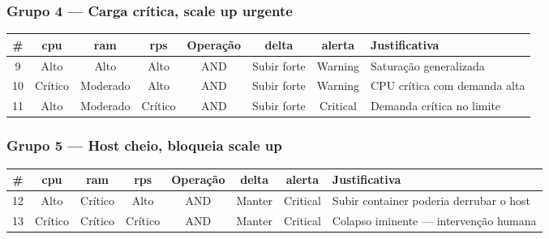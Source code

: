 \documentclass[12pt, a4paper]{article}
\begin{document}
\subsubsection{Grupo 4 — Carga crítica, scale up urgente}
\begin{table}[H]
  \centering
  \begin{tabularx}{\textwidth}{cccccccX}
    \toprule
    \rowcolor{headerblue}
    \textbf{\#} & \textbf{cpu} & \textbf{ram} & \textbf{rps} & \textbf{Operação} & \textbf{delta} & \textbf{alerta} & \textbf{Justificativa} \\
    \midrule
    9  & Alto     & Alto     & Alto     & AND & Subir forte & Warning  & Saturação generalizada \\
    10 & Crítico  & Moderado & Alto     & AND & Subir forte & Warning  & CPU crítica com demanda alta \\
    11 & Alto     & Moderado & Crítico  & AND & Subir forte & Critical & Demanda crítica no limite \\
    \bottomrule
  \end{tabularx}
\end{table}

\subsubsection{Grupo 5 — Host cheio, bloqueia scale up}
\begin{table}[H]
  \centering
  \begin{tabularx}{\textwidth}{cccccccX}
    \toprule
    \rowcolor{headerblue}
    \textbf{\#} & \textbf{cpu} & \textbf{ram} & \textbf{rps} & \textbf{Operação} & \textbf{delta} & \textbf{alerta} & \textbf{Justificativa} \\
    \midrule
    12 & Alto    & Crítico & Alto    & AND & Manter & Critical & Subir container poderia derrubar o host \\
    13 & Crítico & Crítico & Crítico & AND & Manter & Critical & Colapso iminente — intervenção humana \\
    \bottomrule
  \end{tabularx}
\end{table}
\end{document}
